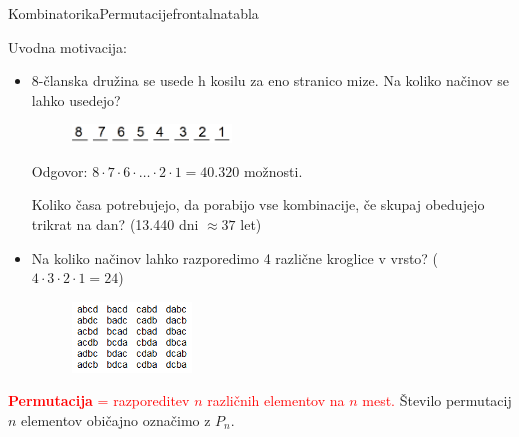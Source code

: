 \begin{priprava}{}{}{Kombinatorika}{Permutacije}{frontalna}{tabla}

Uvodna motivacija:

\begin{itemize}
    \item 8-članska družina se usede h kosilu za eno stranico mize. Na koliko načinov se lahko usedejo?

    
    \begin{figure}[h]
        \centering
        \includegraphics[width=0.4\textwidth]{slike/permutacija1.png}
    \end{figure}
    
    Odgovor: $ 8 \cdot 7 \cdot 6 \cdot \ldots \cdot 2 \cdot 1 = 40.320 $ možnosti.
    
     Koliko časa potrebujejo, da porabijo vse kombinacije, če skupaj obedujejo trikrat na dan? (13.440 dni $ \approx 37 $ let)

    \item Na koliko načinov lahko razporedimo 4 različne kroglice v vrsto? ($ 4 \cdot 3 \cdot 2 \cdot 1 = 24 $)
    
    \begin{figure}[h]
        \centering
        \includegraphics[width=0.3\textwidth]{slike/permutacija2.png}
    \end{figure}

\end{itemize}

\textcolor{red}{\textbf{Permutacija} = razporeditev $ n $ različnih elementov na $ n $ mest.}
Število permutacij $ n $ elementov običajno označimo z $ P_n $.


\end{priprava}
